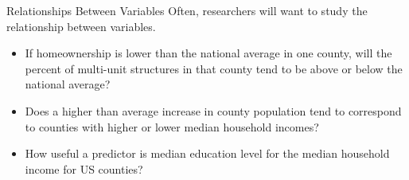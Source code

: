 \documentclass{beamer}
\begin{document}
\begin{frame}
\begin{block}{Relationships Between Variables}
Often, researchers will want to study the relationship between variables.\pause

\begin{itemize}
\item If homeownership is lower than the national average in one county, will the percent of multi-unit structures in that county tend to be above or below the national average?\pause
\item Does a higher than average increase in county population tend to correspond to counties with higher or lower median household incomes?\pause
\item How useful a predictor is median education level for the median household income for US counties?
\end{itemize}
\end{block}
\end{frame}
\end{document}
